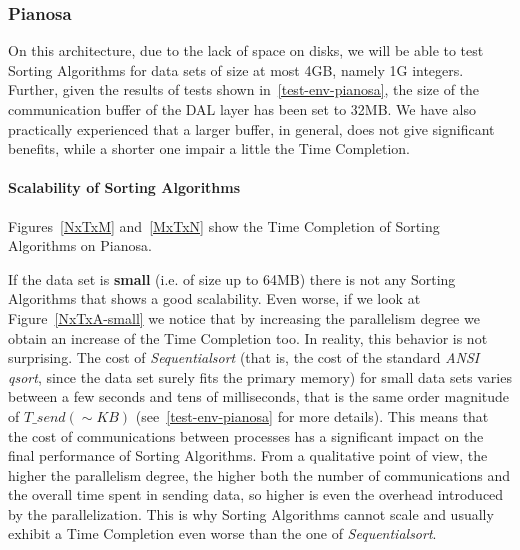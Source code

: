 \subsubsection{Pianosa}
On this architecture, due to the lack of space on disks, we will be able to test Sorting Algorithms for data sets of size at most 4GB, namely 1G integers. Further, given the results of tests shown in~\ref{test-env-pianosa}, the size of the communication buffer of the DAL layer has been set to 32MB. We have also practically experienced that a larger buffer, in general, does not give significant benefits, while a shorter one impair a little the Time Completion.

\paragraph{Scalability of Sorting Algorithms}
Figures~\ref{NxTxM} and~\ref{MxTxN} show the Time Completion of Sorting Algorithms on Pianosa.

If the data set is \textbf{small} (i.e. of size up to 64MB) there is not any Sorting Algorithms that shows a good scalability. Even worse, if we look at Figure~\ref{NxTxA-small} we notice that by increasing the parallelism degree we obtain an increase of the Time Completion too. In reality, this behavior is not surprising. The cost of \textit{Sequentialsort} (that is, the cost of the standard \textit{ANSI qsort}, since the data set surely fits the primary memory) for small data sets varies between a few seconds and tens of milliseconds, that is the same order magnitude of $T\_send( \sim KB )$ (see~\ref{test-env-pianosa} for more details). This means that the cost of communications between processes has a significant impact on the final performance of Sorting Algorithms. From a qualitative point of view, the higher the parallelism degree, the higher both the number of communications and the overall time spent in sending data, so higher is even the overhead introduced by the parallelization. This is why Sorting Algorithms cannot scale and usually exhibit a Time Completion even worse than the one of \textit{Sequentialsort}.

